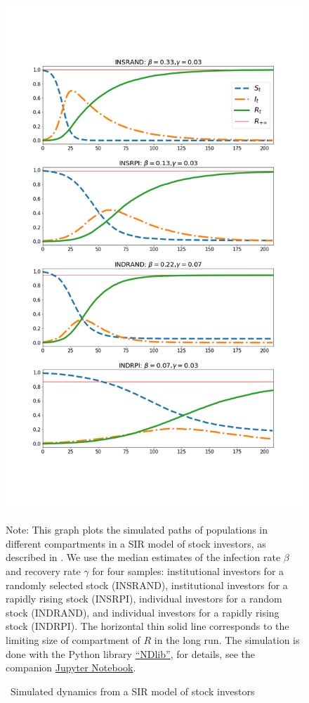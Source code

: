 	\begin{figure} \centering  %
		\caption{ ~Simulated dynamics from a SIR model of stock investors}
		\label{fig:sir_simulate}
		\centerline{\includegraphics[width=\textwidth,height=\textheight]{./figures/sir_simulate.png}}
		\begin{flushleft}
			{\footnotesize Note: This graph plots the simulated paths of populations in different compartments in a SIR model of stock investors, as described in \cite{shiller1989survey}. We use the median estimates of the infection rate $\beta$ and recovery rate $\gamma$ for four samples: institutional investors for a randomly selected stock (INSRAND), institutional investors for a rapidly rising stock (INSRPI), individual investors for a random stock (INDRAND), and individual investors for a rapidly rising stock (INDRPI). The horizontal thin solid line corresponds to the limiting size of compartment of $R$ in the long run. The simulation is done with the Python library \href{https://ndlib.readthedocs.io/en/latest/}{``NDlib''}, for details, see the companion \href{https://github.com/llorracc/EpiExp/blob/master/SIR_Ndlib.ipynb}{Jupyter Notebook}. }
		\end{flushleft}
	\end{figure}
